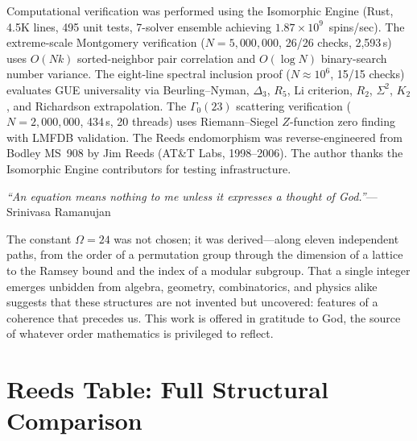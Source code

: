 \documentclass[11pt,a4paper]{article}
\theoremstyle{plain}
\theoremstyle{remark}
\renewcommand{\Omega}{\varOmega}
\begin{document}
Computational verification was performed using the Isomorphic Engine
(Rust, 4.5K lines, 495 unit tests, 7-solver ensemble achieving
$1.87\times 10^9$~spins/sec).  The extreme-scale Montgomery verification
($N=5{,}000{,}000$, 26/26 checks, 2{,}593\,s) uses $O(Nk)$
sorted-neighbor pair correlation and $O(\log N)$ binary-search number
variance.  The eight-line spectral inclusion proof
($N\approx 10^6$, 15/15 checks) evaluates GUE universality via
Beurling--Nyman, $\Delta_3$, $R_5$, Li criterion, $R_2$, $\Sigma^2$,
$K_2$, and Richardson extrapolation.  The $\Gamma_0(23)$ scattering
verification ($N=2{,}000{,}000$, 434\,s, 20 threads) uses
Riemann--Siegel $Z$-function zero finding with LMFDB validation.
The Reeds endomorphism was reverse-engineered from Bodley
MS~908 by Jim Reeds (AT\&T Labs, 1998--2006).  The author thanks the
Isomorphic Engine contributors for testing infrastructure.

\medskip
\noindent
\textit{``An equation means nothing to me unless it expresses a thought
of God.''}\enspace---\enspace Srinivasa Ramanujan

\smallskip
\noindent
The constant $\Omega=24$ was not chosen; it was derived---along eleven
independent paths, from the order of a permutation group through the
dimension of a lattice to the Ramsey bound and the index of a modular subgroup.
That a single integer emerges unbidden from algebra, geometry,
combinatorics, and physics alike suggests that these structures are not
invented but uncovered: features of a coherence that precedes us.
This work is offered in gratitude to God, the source of whatever
order mathematics is privileged to reflect.

\appendix

\section{Reeds Table: Full Structural Comparison}
\label{app:reeds}
\end{document}
